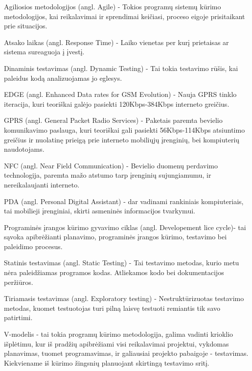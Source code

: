 \documentclass{VUMIFPSkursinis}
\begin{document}
\printbibliography[heading=bibintoc]  %

Agiliosios metodologijos (angl. Agile) - Tokios programų sistemų kūrimo metodologijos, kai reikalavimai ir sprendimai keičiasi, proceso eigoje prisitaikant prie situacijos.

Atsako laikas (angl. Response Time) - Laiko vienetas per kurį prietaisas ar sistema sureaguoja į įvestį.

Dinaminis testavimas (angl. Dynamic Testing) - Tai tokia testavimo rūšis, kai paleidus kodą analizuojamas jo eglesys.

EDGE (angl. Enhanced Data rates for GSM Evolution) - Nauja GPRS tinklo iteracija, kuri teoriškai galėjo pasiekti 120Kbps-384Kbps interneto greičius.

GPRS (angl. General Packet Radio Services) -  Paketais paremta bevielio komunikavimo paslauga, kuri teoriškai gali pasiekti 56Kbps-114Kbps atsiuntimo greičius ir nuolatinę prieigą prie interneto mobiliųjų įrenginių, bei kompiuterių naudotojams.

NFC (angl. Near Field Communication) - Bevielio duomenų perdavimo technologija, paremta mažo atstumo tarp įrenginių sujungiamumu, ir nereikalaujanti interneto.

PDA (angl. Personal Digital Assistant) - dar vadinami rankiniais kompiuteriais, tai mobilieji įrenginiai, skirti asmeninės informacijos tvarkymui.

Programinės įrangos kūrimo gyvavimo ciklas (angl. Developement lice cycle)- tai sąvoka apibrėžianti planavimo, programinės įrangos kūrimo, testavimo bei paleidimo procesus.

Statinis testavimas (angl. Static Testing) - Tai testavimo metodas, kurio metu nėra paleidžiamas programos kodas. Atliekamos kodo bei dokumentacijos peržiūros.

Tiriamasis testavimas (angl. Exploratory testing) - Nestruktūrizuotas testavimo metodas, kuomet testuotojas turi pilną laisvę testuoti remiantis tik savo patirtimi.

V-modelis - tai tokia programų kūrimo metodologija, galima vadinti krioklio išplėtimu, kur iš pradžių apibrėžiami visi reikalavimai projektui, vykdomas planavimas, tuomet programavimas, ir galiausiai projekto pabaigoje - testavimas. Kiekviename iš kūrimo žingsnių planuojant skirtingą testavimo sritį.
\end{document}
